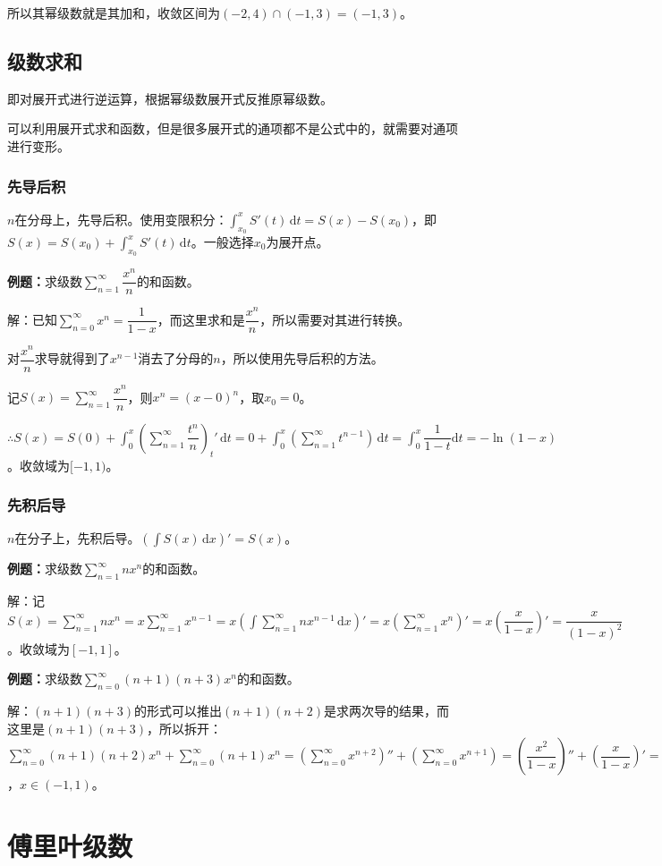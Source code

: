 \documentclass[UTF8, 12pt]{ctexart}
\begin{document}
所以其幂级数就是其加和，收敛区间为$(-2,4)\cap(-1,3)=(-1,3)$。

\subsection{级数求和}

即对展开式进行逆运算，根据幂级数展开式反推原幂级数。

可以利用展开式求和函数，但是很多展开式的通项都不是公式中的，就需要对通项进行变形。

\subsubsection{先导后积}

$n$在分母上，先导后积。使用变限积分：$\int_{x_0}^xS'(t)\,\textrm{d}t=S(x)-S(x_0)$，即$S(x)=S(x_0)+\int_{x_0}^xS'(t)\,\textrm{d}t$。一般选择$x_0$为展开点。

\textbf{例题：}求级数$\sum\limits_{n=1}^\infty\dfrac{x^n}{n}$的和函数。

解：已知$\sum\limits_{n=0}^\infty x^n=\dfrac{1}{1-x}$，而这里求和是$\dfrac{x^n}{n}$，所以需要对其进行转换。

对$\dfrac{x^n}{n}$求导就得到了$x^{n-1}$消去了分母的$n$，所以使用先导后积的方法。

记$S(x)=\sum\limits_{n=1}^\infty\dfrac{x^n}{n}$，则$x^n=(x-0)^n$，取$x_0=0$。

$\therefore S(x)=S(0)+\displaystyle{\int_0^x\left(\sum\limits_{n=1}^\infty\dfrac{t^n}{n}\right)_t'\,\textrm{d}t}=0+\int_0^x(\sum\limits_{n=1}^\infty t^{n-1})\,\textrm{d}t=\displaystyle{\int_0^x\dfrac{1}{1-t}\textrm{d}t}=-\ln(1-x)$。收敛域为$[-1,1)$。

\subsubsection{先积后导}

$n$在分子上，先积后导。$(\int S(x)\,\textrm{d}x)'=S(x)$。

\textbf{例题：}求级数$\sum\limits_{n=1}^\infty nx^n$的和函数。

解：记$S(x)=\sum\limits_{n=1}^\infty nx^n=x\sum\limits_{n=1}^\infty x^{n-1}=x(\int\sum\limits_{n=1}^\infty nx^{n-1}\,\textrm{d}x)'=x(\sum\limits_{n=1}^\infty x^n)'=x\left(\dfrac{x}{1-x}\right)'=\dfrac{x}{(1-x)^2}$。收敛域为$[-1,1]$。

\textbf{例题：}求级数$\sum\limits_{n=0}^\infty(n+1)(n+3)x^n$的和函数。

解：$(n+1)(n+3)$的形式可以推出$(n+1)(n+2)$是求两次导的结果，而这里是$(n+1)(n+3)$，所以拆开：$\sum\limits_{n=0}^\infty(n+1)(n+2)x^n+\sum\limits_{n=0}^\infty(n+1)x^n=\left(\sum\limits_{n=0}^\infty x^{n+2}\right)''+\left(\sum\limits_{n=0}^\infty x^{n+1}\right)=\left(\dfrac{x^2}{1-x}\right)''+\left(\dfrac{x}{1-x}\right)'=\dfrac{3-x}{(1-x)^3}$，$x\in(-1,1)$。

\section{傅里叶级数}
\end{document}

